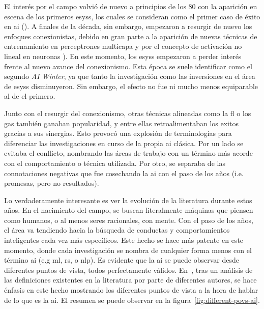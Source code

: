 El interés por el campo volvió de nuevo a principios de los $80$ con la aparición en escena de los primeros \acp{esys}, los cuales se consideran como el primer caso de éxito en \ac{ai} (\cite{russell2003artificial}). A finales de la década, sin embargo, empezaron a resurgir de nuevo los enfoques conexionistas, debido en gran parte a la aparición de nuevas técnicas de entrenamiento en perceptrones multicapa y por el concepto de activación no lineal en neuronas \cite{rumelhart1985learning, cybenko1989approximation}). En este momento, los \acp{esys} empezaron a perder interés frente al nuevo avance del conexionismo. Esta época se suele identificar como el segundo \textit{AI Winter}, ya que tanto la investigación como las inversiones en el área de \acp{esys} disminuyeron. Sin embargo, el efecto no fue ni mucho menos equiparable al de el primero.

Junto con el resurgir del conexionismo, otras técnicas alineadas como la \gls{fl} o los \glspl{ga} también ganaban popularidad, y entre ellas retroalimentaban los exitos gracias a sus sinergias. Esto provocó una explosión de terminologías para diferenciar las investigaciones en curso de la propia \gls{ai} clásica. Por un lado se evitaba el conflicto, nombrando las áreas de trabajo con un término más acorde con el comportamiento o técnica utilizada. Por otro, se separaba de las connotaciones negativas que fue cosechando la \gls{ai} con el paso de los años (i.e. promesas, pero no resultados).

Lo verdaderamente interesante es ver la evolución de la literatura durante estos años. En el nacimiento del campo, se buscan literalmente máquinas que piensen como humanos, o al menos seres racionales, con mente. Con el paso de los años, el área va tendiendo hacia la búsqueda de conductas y comportamientos inteligentes cada vez más específicos. Este hecho se hace más patente en este momento, donde cada investigación se nombra de cualquier forma menos con el término \gls{ai} (e.g \gls{ml}, \gls{rs}, o \gls{nlp}). Es evidente que la \gls{ai} se puede observar desde diferentes puntos de vista, todos perfectamente válidos. En~\cite{russell2003artificial}, tras un análisis de las definiciones existentes en la literatura por parte de diferentes autores, se hace énfasis en este hecho mostrando los diferentes puntos de vista a la hora de hablar de lo que es la \gls{ai}. El resumen se puede observar en la figura~\ref{fig:different-povs-ai}.

